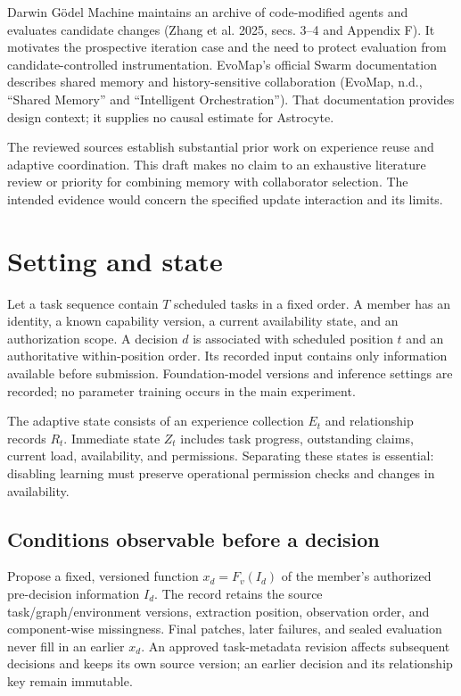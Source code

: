 \documentclass[
  english,
  11pt,
]{article}
\begin{document}
Darwin Gödel Machine maintains an archive of code-modified agents and
evaluates candidate changes (Zhang et al. 2025, secs. 3--4 and Appendix
F). It motivates the prospective iteration case and the need to protect
evaluation from candidate-controlled instrumentation. EvoMap's official
Swarm documentation describes shared memory and history-sensitive
collaboration (EvoMap, n.d., ``Shared Memory'' and ``Intelligent
Orchestration''). That documentation provides design context; it
supplies no causal estimate for Astrocyte.

The reviewed sources establish substantial prior work on experience
reuse and adaptive coordination. This draft makes no claim to an
exhaustive literature review or priority for combining memory with
collaborator selection. The intended evidence would concern the
specified update interaction and its limits.

\section{Setting and state}\label{setting-and-state}

Let a task sequence contain \(T\) scheduled tasks in a fixed order. A
member has an identity, a known capability version, a current
availability state, and an authorization scope. A decision \(d\) is
associated with scheduled position \(t\) and an authoritative
within-position order. Its recorded input contains only information
available before submission. Foundation-model versions and inference
settings are recorded; no parameter training occurs in the main
experiment.

The adaptive state consists of an experience collection \(E_t\) and
relationship records \(R_t\). Immediate state \(Z_t\) includes task
progress, outstanding claims, current load, availability, and
permissions. Separating these states is essential: disabling learning
must preserve operational permission checks and changes in availability.

\subsection{Conditions observable before a
decision}\label{conditions-observable-before-a-decision}

Propose a fixed, versioned function \(x_d=F_v(I_d)\) of the member's
authorized pre-decision information \(I_d\). The record retains the
source task/graph/environment versions, extraction position, observation
order, and component-wise missingness. Final patches, later failures,
and sealed evaluation never fill in an earlier \(x_d\). An approved
task-metadata revision affects subsequent decisions and keeps its own
source version; an earlier decision and its relationship key remain
immutable.
\end{document}
